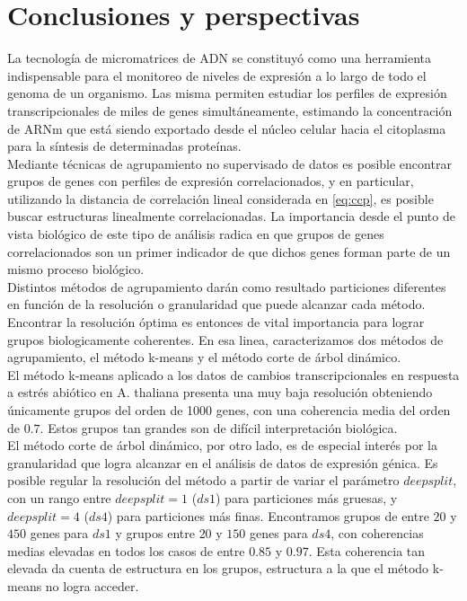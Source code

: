 \chapter{Conclusiones y perspectivas}
La tecnología de micromatrices de ADN se constituyó como una herramienta indispensable para el monitoreo de niveles de expresión a lo largo de todo el genoma de un organismo. Las misma permiten estudiar los perfiles de expresión transcripcionales de miles de genes simultáneamente, estimando la concentración de ARNm que está siendo exportado desde el núcleo celular hacia el citoplasma para la síntesis de determinadas proteínas.\\
Mediante técnicas de agrupamiento no supervisado de datos es posible encontrar grupos de genes con perfiles de expresión correlacionados, y en particular, utilizando la distancia de correlación lineal considerada en \ref{eq:ccp}, es posible buscar estructuras linealmente correlacionadas. La importancia desde el punto de vista biológico de este tipo de análisis radica en que grupos de genes correlacionados son un primer indicador de que dichos genes forman parte de un mismo proceso biológico.\\
Distintos métodos de agrupamiento darán como resultado particiones diferentes en función de la resolución o granularidad que puede alcanzar cada método. Encontrar la resolución óptima es entonces de vital importancia para lograr grupos biologicamente coherentes. En esa linea, caracterizamos dos métodos de agrupamiento, el método k-means y el método corte de árbol dinámico.\\
El método k-means aplicado a los datos de cambios transcripcionales en respuesta a estrés abiótico en A. thaliana presenta una muy baja resolución obteniendo únicamente grupos del orden de 1000 genes, con una coherencia media del orden de $0.7$. Estos grupos tan grandes son de difícil interpretación biológica.\\
El método corte de árbol dinámico, por otro lado, es de especial interés por la granularidad que logra alcanzar en el análisis de datos de expresión génica. Es posible regular la resolución del método a partir de variar el parámetro $deepsplit$, con un rango entre $deepsplit=1$ ($ds1$) para particiones más gruesas, y $deepsplit=4$ ($ds4$) para particiones más finas. Encontramos grupos de entre $20$ y $450$ genes para $ds1$ y grupos entre $20$ y $150$ genes para $ds4$, con coherencias medias elevadas en todos los casos de entre $0.85$ y $0.97$. Esta coherencia tan elevada da cuenta de estructura en los grupos, estructura a la que el método k-means no logra acceder.\\ 
